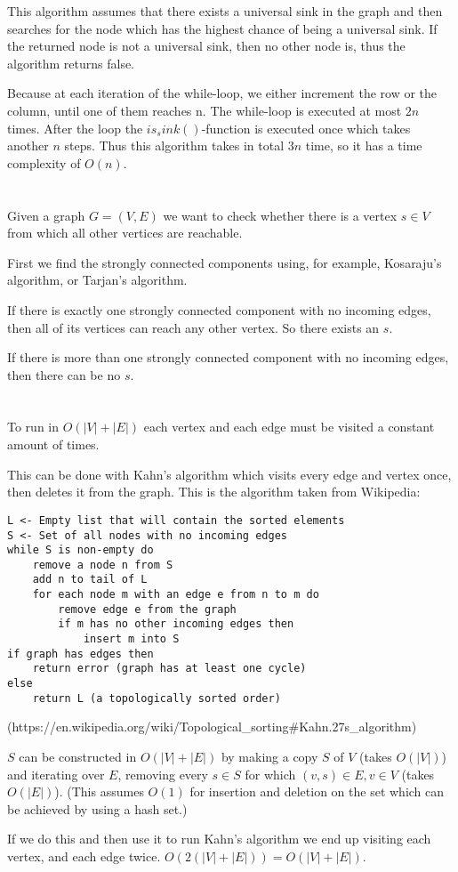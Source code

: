 \documentclass[12pt]{article}
\begin{document}
This algorithm assumes that there exists a universal sink in the graph and then searches for the node which has the highest chance of being a universal sink.
If the returned node is not a universal sink, then no other node is, thus the algorithm returns false.

Because at each iteration of the while-loop, we either increment the row or the column, until one of them reaches n. The while-loop is executed at most $2n$ times.
After the loop the $is_sink()$-function is executed once which takes another $n$ steps.
Thus this algorithm takes in total $3n$ time, so it has a time complexity of $O(n)$.

\section{} %
Given a graph $G = (V, E)$ we want to check whether there is a vertex $s \in V$ from which all other vertices are reachable.

First we find the strongly connected components using, for example, Kosaraju's algorithm, or Tarjan's algorithm.

If there is exactly one strongly connected component with no incoming edges, then all of its vertices can reach any other vertex. So there exists an $s$.

If there is more than one strongly connected component with no incoming edges, then there can be no $s$.

\section{} %
To run in $O(|V| + |E|)$ each vertex and each edge must be visited a constant amount of times.

This can be done with Kahn's algorithm which visits every edge and vertex once, then deletes it from the graph. This is the algorithm taken from Wikipedia:

\begin{lstlisting}
L <- Empty list that will contain the sorted elements
S <- Set of all nodes with no incoming edges
while S is non-empty do
    remove a node n from S
    add n to tail of L
    for each node m with an edge e from n to m do
        remove edge e from the graph
        if m has no other incoming edges then
            insert m into S
if graph has edges then
    return error (graph has at least one cycle)
else
    return L (a topologically sorted order)
\end{lstlisting}
(https://en.wikipedia.org/wiki/Topological\_sorting\#Kahn.27s\_algorithm)

$S$ can be constructed in $O(|V| + |E|)$ by making a copy $S$ of $V$ (takes $O(|V|)$) and iterating over $E$, removing every $s \in S$ for which $(v, s) \in E, v\in V$ (takes $O(|E|)$). (This assumes $O(1)$ for insertion and deletion on the set which can be achieved by using a hash set.)

If we do this and then use it to run Kahn's algorithm we end up visiting each vertex, and each edge twice. $O(2(|V| + |E|)) = O(|V| + |E|)$.
\end{document}
